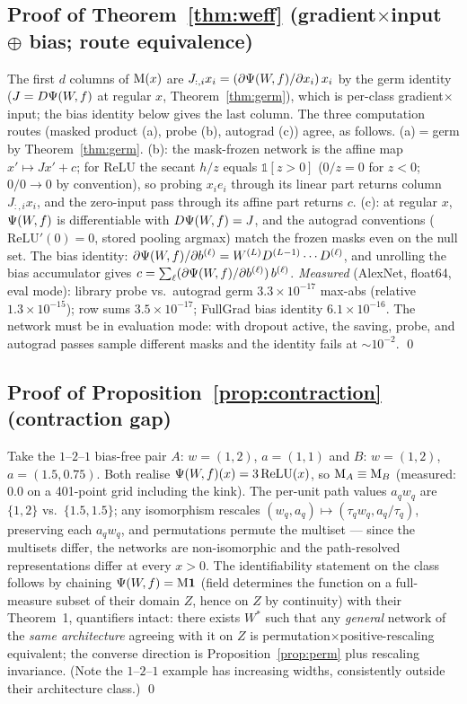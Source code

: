 \subsection{Proof of Theorem~\ref{thm:weff} (gradient$\times$input $\oplus$ bias; route equivalence)}

The first $d$ columns of $\mathrm{M}(x)$ are $J_{:,i}x_i=(\partial\Psi(W\!,f)/\partial x_i)\,x_i$
by the germ identity ($J=D\Psi(W\!,f)$ at regular $x$, Theorem~\ref{thm:germ}), which is
per-class gradient$\times$input; the bias identity below gives the last column.
The three computation routes (masked product (a), probe (b), autograd (c))
agree, as follows.
(a)$=$germ by Theorem~\ref{thm:germ}. (b): the mask-frozen network is the
affine map $x'\mapsto Jx'+c$; for ReLU the secant $h/z$ equals
$\mathbb 1[z>0]$ ($0/z=0$ for $z<0$; $0/0\to0$ by convention), so probing
$x_ie_i$ through its linear part returns column $J_{:,i}x_i$, and the
zero-input pass through its affine part returns $c$. (c): at regular $x$, $\Psi(W\!,f)$
is differentiable with $D\Psi(W\!,f)=J$, and the autograd conventions
($\mathrm{ReLU}'(0)=0$, stored pooling argmax) match the frozen masks even on
the null set. The bias identity: $\partial\Psi(W\!,f)/\partial b^{(\ell)}
=W^{(L)}D^{(L-1)}\cdots D^{(\ell)}$, and unrolling the bias accumulator gives
$c=\sum_\ell(\partial\Psi(W\!,f)/\partial b^{(\ell)})\,b^{(\ell)}$.
\emph{Measured} (AlexNet, float64, eval mode): library probe vs.\ autograd
germ $3.3\times10^{-17}$ max-abs (relative $1.3\times10^{-15}$); row sums
$3.5\times10^{-17}$; FullGrad bias identity $6.1\times10^{-16}$. The
network must be in evaluation mode: with dropout active, the saving, probe,
and autograd passes sample different masks and the identity fails at
$\sim10^{-2}$. \qed

\subsection{Proof of Proposition~\ref{prop:contraction} (contraction gap)}

Take the $1$--$2$--$1$ bias-free pair $A$: $w=(1,2)$, $a=(1,1)$ and $B$:
$w=(1,2)$, $a=(1.5,0.75)$. Both realise $\Psi(W\!,f)(x)=3\,\mathrm{ReLU}(x)$, so
$\mathrm{M}_A\equiv\mathrm{M}_B$ (measured: $0.0$ on a 401-point grid including the kink). The
per-unit path values $a_qw_q$ are $\{1,2\}$ vs.\ $\{1.5,1.5\}$; any
isomorphism rescales $(w_q,a_q)\mapsto(\tau_qw_q,a_q/\tau_q)$, preserving each
$a_qw_q$, and permutations permute the multiset --- since the multisets
differ, the networks are non-isomorphic and the path-resolved representations
differ at every $x>0$. The identifiability statement on the
\citet{phuong2020functional} class follows by chaining $\Psi(W\!,f)=\mathrm{M}\mathbf 1$
(field determines the function on a full-measure subset of their domain $Z$,
hence on $Z$ by continuity) with their Theorem~1, quantifiers intact: there
exists $W^{*}$ such that any \emph{general} network of the \emph{same
architecture} agreeing with it on $Z$ is permutation$\times$positive-rescaling
equivalent; the converse direction is Proposition~\ref{prop:perm} plus
rescaling invariance. (Note the $1$--$2$--$1$ example has increasing widths,
consistently outside their architecture class.) \qed


